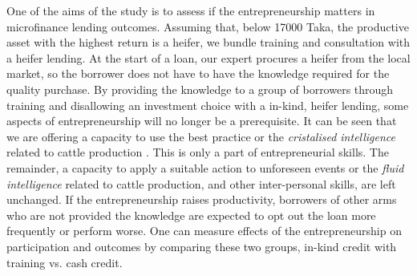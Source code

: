 	One of the aims of the study is to assess if the entrepreneurship matters in microfinance lending outcomes. Assuming that, below 17000 Taka, the productive asset with the highest return is a heifer, we bundle training and consultation with a heifer lending. At the start of a loan, our expert procures a heifer from the local market, so the borrower does not have to have the knowledge required for the quality purchase. By providing the knowledge to a group of borrowers through training and disallowing an investment choice with a in-kind, heifer lending, some aspects of entrepreneurship will no longer be a prerequisite. It can be seen that we are offering a capacity to use the best practice or the \textit{cristalised intelligence} related to cattle production \citep{Cattell1963}. This is only a part of entrepreneurial skills. The remainder, a capacity to apply a suitable action to unforeseen events or the \textit{fluid intelligence} related to cattle production, and other inter-personal skills, are left unchanged. If the entrepreneurship raises productivity, borrowers of other arms who are not provided the knowledge are expected to opt out the loan more frequently or perform worse. One can measure effects of the entrepreneurship on participation and outcomes by comparing these two groups, in-kind credit with training vs. cash credit.
	
